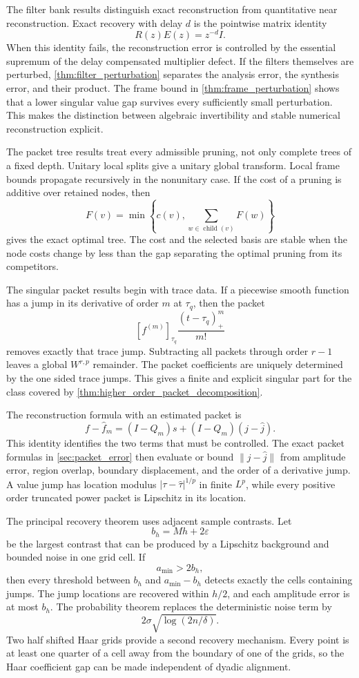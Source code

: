 \documentclass[11pt,letterpaper]{article}
\theoremstyle{plain}
\theoremstyle{plain}
\theoremstyle{plain}
\theoremstyle{definition}
\theoremstyle{definition}
\theoremstyle{definition}
\theoremstyle{definition}
\theoremstyle{remark}
\theoremstyle{remark}
\theoremstyle{remark}
\theoremstyle{remark}
\newcommand{\jump}[1]{\left[#1\right]}
\let\KomorebiPrimitiveWidehat\widehat
\renewcommand{\widehat}[1]{\KomorebiPrimitiveWidehat{#1}}
\begin{document}
The filter bank results distinguish exact reconstruction from quantitative near reconstruction. Exact recovery with delay \(d\) is the pointwise matrix identity
\[
R(z)E(z)=z^{-d}I.
\]
When this identity fails, the reconstruction error is controlled by the essential supremum of the delay compensated multiplier defect. If the filters themselves are perturbed, \cref{thm:filter_perturbation} separates the analysis error, the synthesis error, and their product. The frame bound in \cref{thm:frame_perturbation} shows that a lower singular value gap survives every sufficiently small perturbation. This makes the distinction between algebraic invertibility and stable numerical reconstruction explicit.

The packet tree results treat every admissible pruning, not only complete trees of a fixed depth. Unitary local splits give a unitary global transform. Local frame bounds propagate recursively in the nonunitary case. If the cost of a pruning is additive over retained nodes, then
\[
F(v)
=
\min\left\{
c(v),
\sum_{w\in\operatorname{child}(v)}F(w)
\right\}
\]
gives the exact optimal tree. The cost and the selected basis are stable when the node costs change by less than the gap separating the optimal pruning from its competitors.

The singular packet results begin with trace data. If a piecewise smooth function has a jump in its derivative of order \(m\) at \(\tau_q\), then the packet
\[
\jump{f^{(m)}}_{\tau_q}
\frac{(t-\tau_q)_+^m}{m!}
\]
removes exactly that trace jump. Subtracting all packets through order \(r-1\) leaves a global \(W^{r,p}\) remainder. The packet coefficients are uniquely determined by the one sided trace jumps. This gives a finite and explicit singular part for the class covered by \cref{thm:higher_order_packet_decomposition}.

The reconstruction formula with an estimated packet is
\[
f-\widehat f_m
=
(I-Q_m)s+(I-Q_m)(j-\widehat j).
\]
This identity identifies the two terms that must be controlled. The exact packet formulas in \cref{sec:packet_error} then evaluate or bound \(\|j-\widehat j\|\) from amplitude error, region overlap, boundary displacement, and the order of a derivative jump. A value jump has location modulus \(|\tau-\widehat\tau|^{1/p}\) in finite \(L^p\), while every positive order truncated power packet is Lipschitz in its location.

The principal recovery theorem uses adjacent sample contrasts. Let
\[
b_h=Mh+2\varepsilon
\]
be the largest contrast that can be produced by a Lipschitz background and bounded noise in one grid cell. If
\[
a_{\min}>2b_h,
\]
then every threshold between \(b_h\) and \(a_{\min}-b_h\) detects exactly the cells containing jumps. The jump locations are recovered within \(h/2\), and each amplitude error is at most \(b_h\). The probability theorem replaces the deterministic noise term by
\[
2\sigma\sqrt{\log(2n/\delta)}.
\]
Two half shifted Haar grids provide a second recovery mechanism. Every point is at least one quarter of a cell away from the boundary of one of the grids, so the Haar coefficient gap can be made independent of dyadic alignment.
\end{document}
